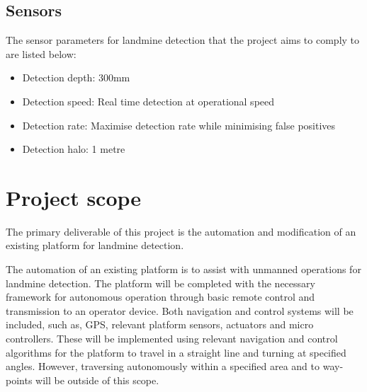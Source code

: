 \documentclass[main.tex]{subfiles}
\begin{document}
\subsection{Sensors}
The sensor parameters for landmine detection that the project aims to comply to are listed below:
\begin{itemize}
\item Detection depth: 300mm 
\item Detection speed: Real time detection at operational speed
\item Detection rate: Maximise detection rate while minimising false positives
\item Detection halo: 1 metre
\end{itemize}

\section{Project scope}

The primary deliverable of this project is the automation and modification of an existing platform for landmine detection. %

The automation of an existing platform is to assist with unmanned operations for landmine detection. The platform will be completed with the necessary framework for autonomous operation through basic remote control and transmission to an operator device. Both navigation and control systems will be included, such as, GPS, relevant platform sensors, actuators and micro controllers. These will be implemented using relevant navigation and control algorithms for the platform to travel in a straight line and turning at specified angles. However, traversing autonomously within a specified area and to way-points will be outside of this scope. 
\end{document}
